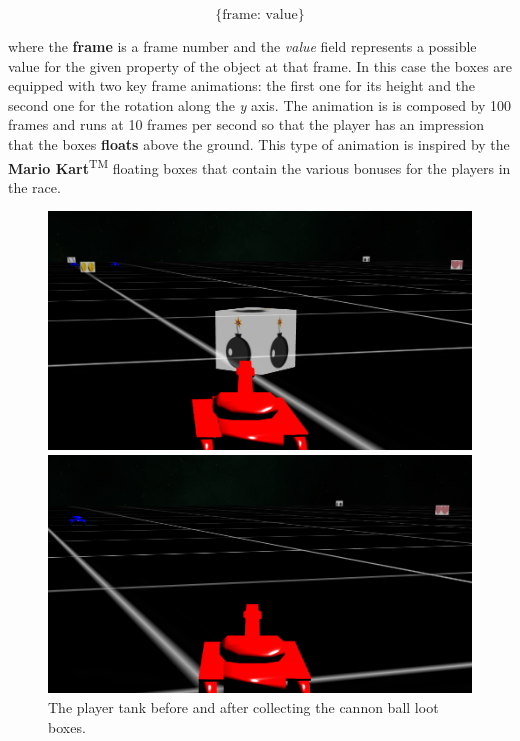 \documentclass[14pt]{article}
\begin{document}
\[\text{\{frame: value\}}\]

where the \textbf{frame} is a frame number and the \textit{value} field represents a possible value for the given property of the object at that frame. In this case the boxes are equipped with two key frame animations: the first one for its height and the second one for the rotation along the \textit{y} axis. The animation is is composed by 100 frames and runs at 10 frames per second so that the player has an impression that the boxes \textbf{floats} above the ground. This type of animation is inspired by the \textbf{Mario Kart}\textsuperscript{TM} floating boxes that contain the various bonuses for the players in the race.\\

\begin{figure}[H]
\begin{minipage}[t]{0.45\textwidth}
\center
\includegraphics[width=\textwidth]{images/beforeLoot.png}
\end{minipage}
\hfill
\begin{minipage}[t]{0.45\textwidth}
\center
\includegraphics[width=\textwidth]{images/afterLoot.png}
\end{minipage}
\caption{The player tank before and after collecting the cannon ball loot boxes.}
\label{img:beforeAfterLooting}
\end{figure}
\end{document}
